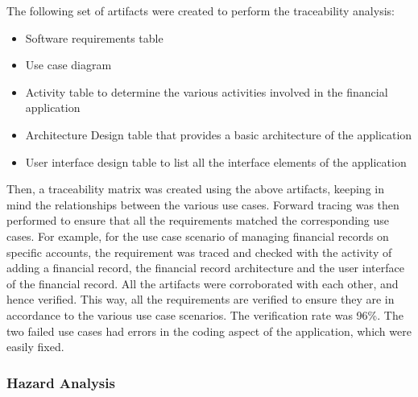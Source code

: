 \documentclass[journal, onecolumn]{IEEEtran}
\begin{document}
	The following set of artifacts were created to perform the traceability analysis:
	\begin{itemize}
		\item Software requirements table
		\item Use case diagram
		\item Activity table to determine the various activities involved in the financial application
		\item Architecture Design table that provides a basic architecture of the application
		\item User interface design table to list all the interface elements of the application
	\end{itemize}
	
	Then, a traceability matrix was created using the above artifacts, keeping in mind the relationships between the various use cases. 
	\newline \newline
	Forward tracing was then performed to ensure that all the requirements matched the corresponding use cases. For example, for the use case scenario of managing financial records on specific accounts, the requirement was traced and checked with the activity of adding a financial record, the financial record architecture and the user interface of the financial record. All the artifacts were corroborated with each other, and hence verified.
	\newline \newline
	This way, all the requirements are verified to ensure they are in accordance to the various use case scenarios. The verification rate was 96\%. The two failed use cases had errors in the coding aspect of the application, which were easily fixed. 
	
	\bigskip
	
	\subsubsection{Hazard Analysis}
	
\end{document}
